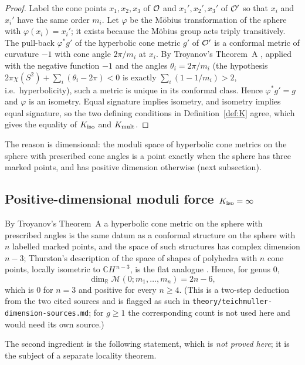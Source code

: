 \begin{proof}
Label the cone points $x_1,x_2,x_3$ of $\mathcal{O}$ and $x_1',x_2',x_3'$ of $\mathcal{O}'$ so that $x_i$ and
$x_i'$ have the same order $m_i$. Let $\varphi$ be the M\"obius transformation of the sphere with
$\varphi(x_i)=x_i'$; it exists because the M\"obius group acts triply transitively. The pull-back
$\varphi^*g'$ of the hyperbolic cone metric $g'$ of $\mathcal{O}'$ is a conformal metric of curvature $-1$
with cone angle $2\pi/m_i$ at $x_i$. By Troyanov's Theorem~A \cite{troyanov1991}, applied with the
negative function $-1$ and the angles $\theta_i=2\pi/m_i$ (the hypothesis
$2\pi\chi(S^2)+\sum_i(\theta_i-2\pi)<0$ is exactly $\sum_i(1-1/m_i)>2$, i.e.\ hyperbolicity), such a
metric is unique in its conformal class. Hence $\varphi^*g'=g$ and $\varphi$ is an isometry.
Equal signature implies isometry, and isometry implies equal signature, so the two defining
conditions in Definition~\ref{def:K} agree, which gives the equality of $K_{\mathrm{iso}}$ and $K_{\mathrm{mult}}$.
\end{proof}

The reason is dimensional: the moduli space of hyperbolic cone metrics on the sphere with prescribed
cone angles is a point exactly when the sphere has three marked points, and has positive dimension
otherwise (next subsection).

\subsection{Positive-dimensional moduli force \texorpdfstring{$K_{\mathrm{iso}}=\infty$}{K-iso = infinity}}

By Troyanov's Theorem~A a hyperbolic cone metric on the sphere with prescribed angles is the same
datum as a conformal structure on the sphere with $n$ labelled marked points, and the space of such
structures has complex dimension $n-3$; Thurston's description of the space of shapes of
polyhedra with $n$ cone points, locally isometric to $\mathbb{C}H^{\,n-3}$, is the flat analogue
\cite{thurston1998}. Hence, for genus $0$,
\begin{equation}\label{eq:moduli}
  \dim_{\mathbb R}\mathcal M(0;m_1,\dots,m_n)=2n-6,
\end{equation}
which is $0$ for $n=3$ and positive for every $n\ge4$. (This is a two-step deduction from the two
cited sources and is flagged as such in \texttt{theory/teichmuller-dimension-sources.md}; for $g\ge1$
the corresponding count is not used here and would need its own source.)

The second ingredient is the following statement, which is \emph{not proved here}; it is the
subject of a separate locality theorem.

